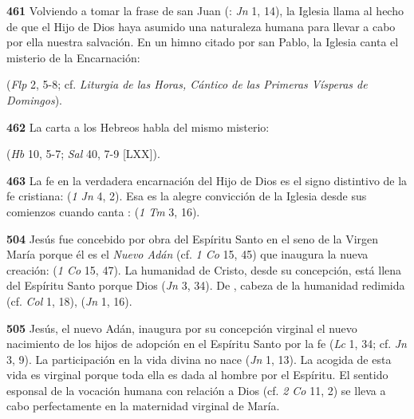 \textbf{461} Volviendo a tomar la frase de san Juan (: \emph{Jn} 1, 14), la Iglesia llama  al hecho de que el Hijo de Dios haya asumido una naturaleza humana para llevar a cabo por ella nuestra salvación. En un himno citado por san Pablo, la Iglesia canta el misterio de la Encarnación:

 (\emph{Flp} 2, 5-8; cf. \emph{Liturgia de las Horas, Cántico de las Primeras Vísperas de Domingos}).

\textbf{462} La carta a los Hebreos habla del mismo misterio:

 (\emph{Hb} 10, 5-7; \emph{Sal} 40, 7-9 {[}LXX{]}).

\textbf{463} La fe en la verdadera encarnación del Hijo de Dios es el signo distintivo de la fe cristiana:  (\emph{1 Jn} 4, 2). Esa es la alegre convicción de la Iglesia desde sus comienzos cuando canta :  (\emph{1 Tm} 3, 16).

\textbf{504} Jesús fue concebido por obra del Espíritu Santo en el seno de la Virgen María porque él es el \emph{Nuevo Adán} (cf. \emph{1 Co} 15, 45) que inaugura la nueva creación:  (\emph{1 Co} 15, 47). La humanidad de Cristo, desde su concepción, está llena del Espíritu Santo porque Dios  (\emph{Jn} 3, 34). De , cabeza de la humanidad redimida (cf. \emph{Col} 1, 18),  (\emph{Jn} 1, 16).

\textbf{505} Jesús, el nuevo Adán, inaugura por su concepción virginal el nuevo nacimiento de los hijos de adopción en el Espíritu Santo por la fe  (\emph{Lc} 1, 34; cf. \emph{Jn} 3, 9). La participación en la vida divina no nace  (\emph{Jn} 1, 13). La acogida de esta vida es virginal porque toda ella es dada al hombre por el Espíritu. El sentido esponsal de la vocación humana con relación a Dios (cf. \emph{2 Co} 11, 2) se lleva a cabo perfectamente en la maternidad virginal de María.

